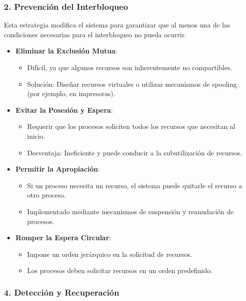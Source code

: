 \subsubsection{2. Prevención del Interbloqueo}

Esta estrategia modifica el sistema para garantizar que al menos una de las condiciones necesarias para el interbloqueo no pueda ocurrir.

\begin{itemize}
	\item \textbf{Eliminar la Exclusión Mutua}:
	\begin{itemize}
		\item Difícil, ya que algunos recursos son inherentemente no compartibles.
		\item Solución: Diseñar recursos virtuales o utilizar mecanismos de spooling (por ejemplo, en impresoras).
	\end{itemize}
	\item \textbf{Evitar la Posesión y Espera}:
	\begin{itemize}
		\item Requerir que los procesos soliciten todos los recursos que necesitan al inicio.
		\item Desventaja: Ineficiente y puede conducir a la subutilización de recursos.
	\end{itemize}
	\item \textbf{Permitir la Apropiación}:
	\begin{itemize}
		\item Si un proceso necesita un recurso, el sistema puede quitarle el recurso a otro proceso.
		\item Implementado mediante mecanismos de suspensión y reanudación de procesos.
	\end{itemize}
	\item \textbf{Romper la Espera Circular}:
	\begin{itemize}
		\item Impone un orden jerárquico en la solicitud de recursos.
		\item Los procesos deben solicitar recursos en un orden predefinido.
	\end{itemize}
\end{itemize}



\subsubsection{4. Detección y Recuperación}

